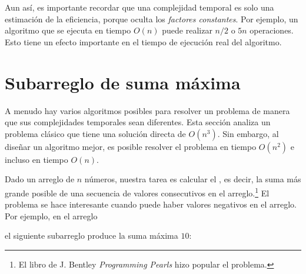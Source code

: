
Aun así, es importante recordar que una
complejidad temporal es solo una estimación de la eficiencia,
porque oculta los \emph{factores constantes}.
Por ejemplo, un algoritmo que se ejecuta en tiempo $O(n)$
puede realizar $n/2$ o $5n$ operaciones.
Esto tiene un efecto importante en el tiempo de ejecución
real del algoritmo.

\section{Subarreglo de suma máxima}


A menudo hay varios algoritmos posibles
para resolver un problema de manera que sus
complejidades temporales sean diferentes.
Esta sección analiza un problema clásico que
tiene una solución directa de $O(n^3)$.
Sin embargo, al diseñar un algoritmo mejor, es
posible resolver el problema en tiempo $O(n^2)$
e incluso en tiempo $O(n)$.

Dado un arreglo de $n$ números,
nuestra tarea es calcular el
, es decir,
la suma más grande posible de
una secuencia de valores consecutivos
en el arreglo.\footnote{El libro de J. Bentley
    \emph{Programming Pearls} \cite{ben86} hizo popular el problema.}
El problema se hace interesante cuando puede haber
valores negativos en el arreglo.
Por ejemplo, en el arreglo
\begin{center}
\end{center}
\begin{samepage}
    el siguiente subarreglo produce la suma máxima $10$:
    \begin{center}
    \end{center}
\end{samepage}

